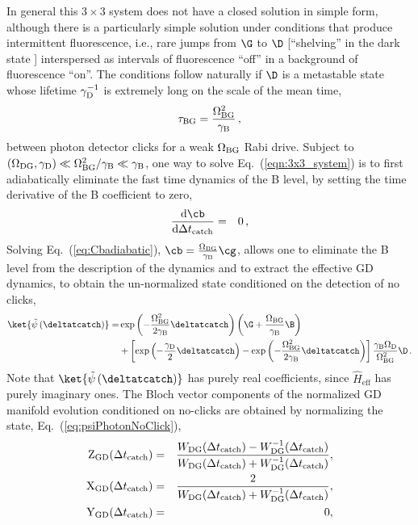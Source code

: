 In general this $3\times3$ system does not have a closed solution
in simple form, although there is a particularly simple solution under
conditions that produce intermittent fluorescence, i.e., rare jumps
from $\G$ to $\D$ {[}``shelving'' in the dark state \citep{Nagourney1986}{]}
interspersed as intervals of fluorescence ``off'' in a background
of fluorescence ``on''. The conditions follow naturally if $\D$
is a metastable state \citep{Nagourney1986,Sauter1986,Bergquist1986}
whose lifetime $\gamma_{{\rm D}}^{-1}$ is extremely long on the scale
of the mean time, 
\begin{equation}
\tau_{\mathrm{BG}}=\frac{\Omega_{{\rm BG}}^{2}}{\gamma_{\mathrm{B}}}\,,\label{eq:GammaBG}
\end{equation}
between photon detector clicks for a weak $\Omega_{{\rm BG}}$ Rabi
drive. Subject to $(\Omega_{{\rm DG}},\gamma_{{\rm D}})\ll\Omega_{{\rm BG}}^{2}/\gamma_{{\rm B}}\ll\gamma_{{\rm B}}$,
one way to solve Eq.~(\ref{eqn:3x3_system}) is to first adiabatically
eliminate the fast time dynamics of the B level, by setting the time
derivative of the B coefficient to zero, 
\begin{eqnarray}
\frac{\mathrm{d}\cb}{\mathrm{d}\Delta t_{{\rm catch}}} & = & 0\,,\label{eq:Cbadiabatic}
\end{eqnarray}
Solving Eq.~(\ref{eq:Cbadiabatic}), $\cb=\frac{\Omega_{\mathrm{BG}}}{\gamma_{\mathrm{B}}}\cg$,
allows one to eliminate the B level from the description of the dynamics
and to extract the effective GD dynamics, to obtain the un-normalized
state conditioned on the detection of no clicks,
\begin{align}
\ket{\tilde{\psi}\left(\deltatcatch\right)}= & \exp\left(-\frac{\Omega_{{\rm BG}}^{2}}{2\gamma_{\mathrm{B}}}\deltatcatch\right)\left(\G+\frac{\Omega_{\mathrm{BG}}}{\gamma_{\mathrm{B}}}\B\right)\nonumber \\
 & +\left[\exp\left(-\frac{\gamma_{\mathrm{D}}}{2}\deltatcatch\right)-\exp\left(-\frac{\Omega_{{\rm BG}}^{2}}{2\gamma_{\mathrm{B}}}\deltatcatch\right)\right]\frac{\gamma_{\mathrm{B}}\Omega_{\mathrm{D}}}{\Omega_{{\rm BG}}^{2}}\D\,.\label{eq:psiPhotonNoClick}
\end{align}
Note that $\ket{\tilde{\psi}\left(\deltatcatch\right)}$ has purely
real coefficients, since $\hat{H}_{\mathrm{eff}}$ has purely imaginary
ones. The Bloch vector components of the normalized GD manifold evolution
conditioned on no-clicks are obtained by normalizing the state, Eq.~(\ref{eq:psiPhotonNoClick}),
\begin{eqnarray}
{\rm Z}_{{\rm GD}}(\Delta t_{{\rm catch}}) & = & \frac{W_{{\rm DG}}(\Delta t_{{\rm catch}})-W_{{\rm DG}}^{-1}(\Delta t_{{\rm catch}})}{W_{{\rm DG}}(\Delta t_{{\rm catch}})+W_{{\rm DG}}^{-1}(\Delta t_{{\rm catch}})},\label{eqn:Z}\\
{\rm X}_{{\rm GD}}(\Delta t_{{\rm catch}}) & = & \frac{2}{W_{{\rm DG}}(\Delta t_{{\rm catch}})+W_{{\rm DG}}^{-1}(\Delta t_{{\rm catch}})},\label{eqn:X}\\
{\rm Y}_{{\rm GD}}(\Delta t_{{\rm catch}}) & = & 0,\label{eqn:Y}
\end{eqnarray}
